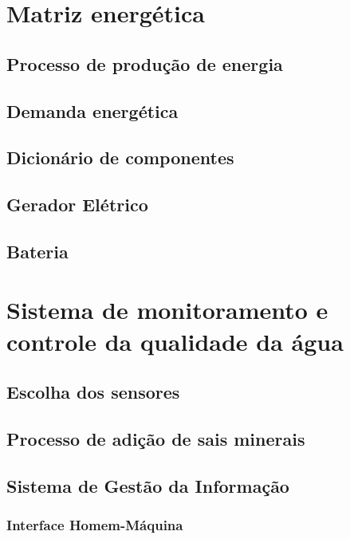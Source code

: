   \section{Matriz energética}
  	\subsection{Processo de produção de energia}
  		
  	\subsection{Demanda energética}
  		
  	\subsection{Dicionário de componentes}
  		
  	\subsection{Gerador Elétrico}
  		
  	\subsection{Bateria}
  		
    
  \section{Sistema de monitoramento e controle da qualidade da água}
    
    \subsection{Escolha dos sensores}
      
      
      
      
      
    
    \pagebreak
    \subsection{Processo de adição de sais minerais}
    
      
    
    \vfill
    
    \pagebreak
    \subsection{Sistema de Gestão da Informação}
      
      
    \subsubsection{Interface Homem-Máquina}
      	

    
    
    
    
    